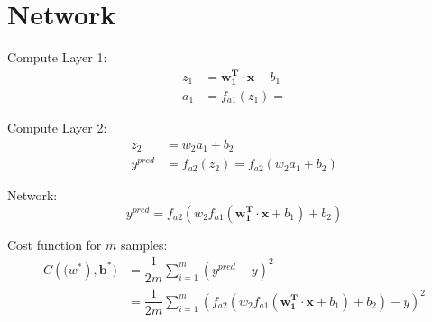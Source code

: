 \documentclass{article}
\begin{document}
\section*{Network}
\begin{center}
\end{center}

Compute Layer 1:
\begin{align}
  z_1 &= \mathbf{w_1^T} \cdot \mathbf{x} + b_1 \nonumber \\
  a_1 &= f_{a1}(z_1) = 
\end{align}

Compute Layer 2:
\begin{align}
  z_2 &= w_2 a_1 + b_2 \nonumber \\
  y^{pred} &= f_{a2}(z_2) = f_{a2}(w_2 a_1 + b_2)
\end{align}

Network:
\begin{equation}
  y^{pred} = f_{a2}(w_2 f_{a1}(\mathbf{w_1^T} \cdot \mathbf{x} + b_1) + b_2)
\end{equation}

Cost function for $m$ samples:
\begin{align}
  C(\mathbf(w^*),\mathbf{b^*}) &= \dfrac{1}{2m} \sum_{i=1}^m (y^{pred} - y)^2 \nonumber \\
  &= \dfrac{1}{2m} \sum_{i=1}^m (f_{a2}(w_2 f_{a1}(\mathbf{w_1^T} \cdot \mathbf{x} + b_1) + b_2) - y)^2
\end{align}
\end{document}
